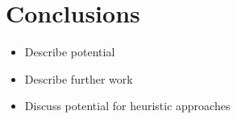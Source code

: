 \documentclass[a4paper,11pt]{article}
\begin{document}
\section{Conclusions}\label{sec:conclusion}

\begin{itemize}
    \item Describe potential
    \item Describe further work
    \item Discuss potential for heuristic approaches
\end{itemize}

\newpage



%
%
%
%
%
%
\end{document}
